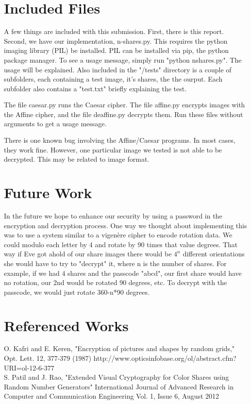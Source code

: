 \documentclass{article}
\begin{document}
\section*{Included Files}
A few things are included with this submission.  First, there is this report.  Second, we have our implementation, n-shares.py. This requires the python imaging library (PIL) be installed.  PIL can be installed via pip, the python package manager.  To see a usage message, simply run "python nshares.py".  The usage will be explained.  Also included in the "/tests" directory is a couple of subfolders, each containing a test image, it's shares, the the ourput.  Each subfolder also contains a "test.txt" briefly explaining the test.  

The file caesar.py runs the Caesar cipher.  The file affine.py encrypts images with the Affine cipher, and the file deaffine.py decrypts them.  Run these files without arguments to get a usage message.

There is one known bug involving the Affine/Caesar programs.  In most cases, they work fine.  However, one particular image we tested is not able to be decrypted.  This may be related to image format.
\section*{Future Work}
In the future we hope to enhance our security by using a password in the encryption and decryption process.  One way we thought about implementing this was to use a system similar to a vigenère cipher to encode rotation data.  We could modulo each letter by 4 and rotate by 90 times that value degrees.  That way if Eve got ahold of our share images there would be $4^n$ different orientations she would have to try to "decrypt" it, where n is the number of shares.  For example, if we had 4 shares and the passcode "abcd", our first share would have no rotation, our 2nd would be rotated 90 degrees, etc.  To decrypt with the passcode, we would just rotate 360-n*90 degrees.  
\section*{Referenced Works}
O. Kafri and E. Keren, "Encryption of pictures and shapes by random grids," Opt. Lett. 12, 377-379 (1987) 
http://www.opticsinfobase.org/ol/abstract.cfm?URI=ol-12-6-377
\\

S. Patil and J. Rao, "Extended Visual Cryptography for Color Shares using Random Number Generators" International Journal of Advanced Research in Computer and Communication Engineering 
 Vol. 1, Issue 6, August 2012 
\end{document}
